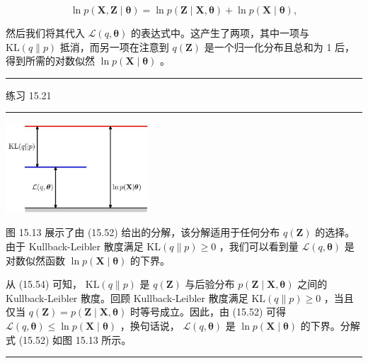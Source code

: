 \documentclass[10pt]{report}
\newcommand{\HRule}{\begin{center}\rule{0.9\linewidth}{0.2mm}\end{center}}
\begin{document}
\[
\ln p\left( {\mathbf{X},\mathbf{Z} \mid  \mathbf{\theta }}\right)  = \ln p\left( {\mathbf{Z} \mid  \mathbf{X},\mathbf{\theta }}\right)  + \ln p\left( {\mathbf{X} \mid  \mathbf{\theta }}\right) , \tag{15.55}
\]

然后我们将其代入 \(\mathcal{L}\left( {q,\mathbf{\theta }}\right)\) 的表达式中。这产生了两项，其中一项与 \(\mathrm{{KL}}\left( {q\parallel p}\right)\) 抵消，而另一项在注意到 \(q\left( \mathbf{Z}\right)\) 是一个归一化分布且总和为 1 后，得到所需的对数似然 \(\ln p\left( {\mathbf{X} \mid  \mathbf{\theta }}\right)\) 。

\HRule

练习 15.21

\HRule

\begin{center}
\includegraphics[max width=0.4\textwidth]{images/0194e279-9b28-703a-88f4-c3ac21e2010d_505_947_344_604_379_0.jpg}
\end{center}
\hspace*{3em} 

图 15.13 展示了由 (15.52) 给出的分解，该分解适用于任何分布 \(q\left( \mathbf{Z}\right)\) 的选择。由于 Kullback-Leibler 散度满足 \(\mathrm{{KL}}\left( {q\parallel p}\right)  \geq  0\) ，我们可以看到量 \(\mathcal{L}\left( {q,\mathbf{\theta }}\right)\) 是对数似然函数 \(\ln p\left( {\mathbf{X} \mid  \mathbf{\theta }}\right)\) 的下界。

从 (15.54) 可知， \(\mathrm{{KL}}\left( {q\parallel p}\right)\) 是 \(q\left( \mathbf{Z}\right)\) 与后验分布 \(p\left( {\mathbf{Z} \mid  \mathbf{X},\mathbf{\theta }}\right)\) 之间的 Kullback-Leibler 散度。回顾 Kullback-Leibler 散度满足 \(\mathrm{{KL}}\left( {q\parallel p}\right)  \geq  0\) ，当且仅当 \(q\left( \mathbf{Z}\right)  = p\left( {\mathbf{Z} \mid  \mathbf{X},\mathbf{\theta }}\right)\) 时等号成立。因此，由 (15.52) 可得 \(\mathcal{L}\left( {q,\mathbf{\theta }}\right)  \leq  \ln p\left( {\mathbf{X} \mid  \mathbf{\theta }}\right)\) ，换句话说， \(\mathcal{L}\left( {q,\mathbf{\theta }}\right)\) 是 \(\ln p\left( {\mathbf{X} \mid  \mathbf{\theta }}\right)\) 的下界。分解式 (15.52) 如图 15.13 所示。

\HRule
\end{document}
